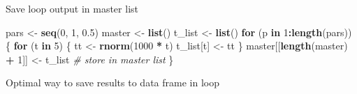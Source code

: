 \documentclass[10,portrait]{article}
\newenvironment{Shaded}{\begin{snugshade}}{\end{snugshade}}
\newcommand{\KeywordTok}[1]{\textcolor[rgb]{0.13,0.29,0.53}{\textbf{#1}}}
\newcommand{\DecValTok}[1]{\textcolor[rgb]{0.00,0.00,0.81}{#1}}
\newcommand{\FloatTok}[1]{\textcolor[rgb]{0.00,0.00,0.81}{#1}}
\newcommand{\StringTok}[1]{\textcolor[rgb]{0.31,0.60,0.02}{#1}}
\newcommand{\CommentTok}[1]{\textcolor[rgb]{0.56,0.35,0.01}{\textit{#1}}}
\newcommand{\ControlFlowTok}[1]{\textcolor[rgb]{0.13,0.29,0.53}{\textbf{#1}}}
\newcommand{\OperatorTok}[1]{\textcolor[rgb]{0.81,0.36,0.00}{\textbf{#1}}}
\newcommand{\NormalTok}[1]{#1}
\begin{document}
Save loop output in master list

\begin{Shaded}
\begin{Highlighting}[]
\NormalTok{pars <-}\StringTok{ }\KeywordTok{seq}\NormalTok{(}\DecValTok{0}\NormalTok{, }\DecValTok{1}\NormalTok{, }\FloatTok{0.5}\NormalTok{)}
\NormalTok{master <-}\StringTok{ }\KeywordTok{list}\NormalTok{()}
\NormalTok{t_list <-}\StringTok{ }\KeywordTok{list}\NormalTok{()}
\ControlFlowTok{for}\NormalTok{ (p }\ControlFlowTok{in} \DecValTok{1}\OperatorTok{:}\KeywordTok{length}\NormalTok{(pars)) \{}
    \ControlFlowTok{for}\NormalTok{ (t }\ControlFlowTok{in} \DecValTok{5}\NormalTok{) \{}
\NormalTok{        tt <-}\StringTok{ }\KeywordTok{rnorm}\NormalTok{(}\DecValTok{1000} \OperatorTok{*}\StringTok{ }\NormalTok{t)}
\NormalTok{        t_list[t] <-}\StringTok{ }\NormalTok{tt}
\NormalTok{    \}}
\NormalTok{    master[[}\KeywordTok{length}\NormalTok{(master) }\OperatorTok{+}\StringTok{ }\DecValTok{1}\NormalTok{]] <-}\StringTok{ }\NormalTok{t_list  }\CommentTok{# store in master list}
\NormalTok{\}}
\end{Highlighting}
\end{Shaded}

Optimal way to save results to data frame in loop
\end{document}
